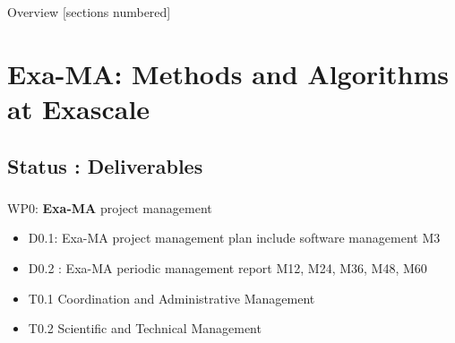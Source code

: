 \titleframe

\begin{frame}{Overview}
  [sections numbered]
  \tableofcontents[hideallsubsections]
\end{frame}


\section{Exa-MA: Methods and Algorithms at Exascale}

\subsection{Status : Deliverables}

\begin{frame}
  \frametitle{\insertsectionhead}
  \framesubtitle{\insertsubsectionhead}

  WP0: \textbf{Exa-MA} project management
  \begin{itemize}
    \item D0.1: Exa-MA project management plan include software management M3
    \item D0.2 : Exa-MA periodic management report M12, M24, M36, M48, M60
  \end{itemize}
   
  \begin{itemize}
    \item T0.1	Coordination and Administrative Management
    \item T0.2	Scientific and Technical Management
  \end{itemize}

\end{frame}

